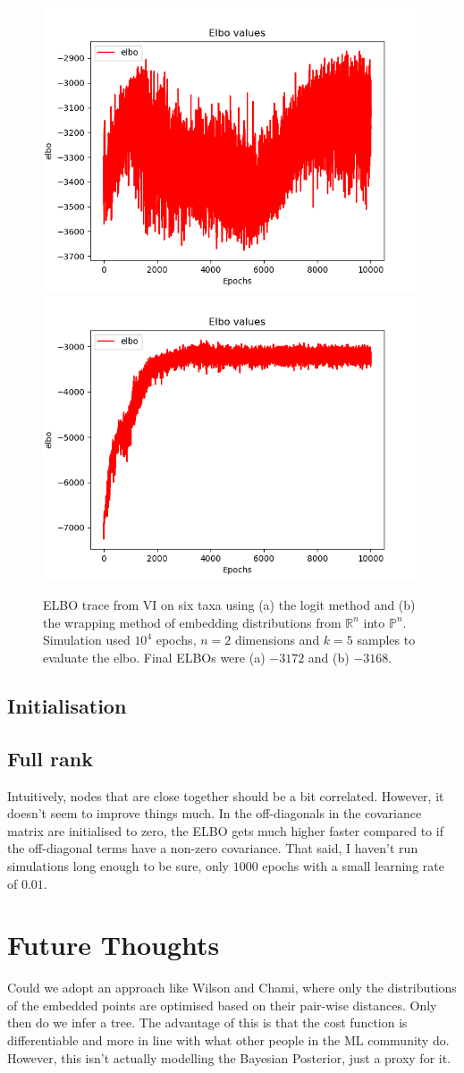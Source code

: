 \documentclass[11pt]{article}
\begin{document}
\begin{figure}[htbp]
\begin{center}
\includegraphics[width=.5\linewidth]{fig/elbo_trace_logit.png}%
\includegraphics[width=.5\linewidth]{fig/elbo_trace_wrap.png}
\caption{ELBO trace from VI on six taxa using (a) the logit method and (b) the wrapping method of embedding distributions from $\mathbb{R}^{n}$ into $\mathbb{P}^{n}$. Simulation used $10^{4}$ epochs, $n=2$ dimensions and $k=5$ samples to evaluate the elbo. Final ELBOs were (a) $-3172$ and (b) $-3168$.}
\label{default}
\end{center}
\end{figure}

\subsection{Initialisation}

\subsection{Full rank}
Intuitively, nodes that are close together should be a bit correlated. However, it doesn't seem to improve things much. In the off-diagonals in the covariance matrix are initialised to zero, the ELBO gets much higher faster compared to if the off-diagonal terms have a non-zero covariance. That said, I haven't run simulations long enough to be sure, only $1000$ epochs with a small learning rate of $0.01$.

\section{Future Thoughts}
Could we adopt an approach like Wilson and Chami, where only the distributions of the embedded points are optimised based on their pair-wise distances.
Only then do we infer a tree.
The advantage of this is that the cost function is differentiable and more in line with what other people in the ML community do.
However, this isn't actually modelling the Bayesian Posterior, just a proxy for it.
\end{document}
